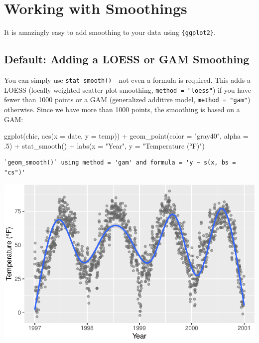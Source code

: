 \documentclass[
  letterpaper,
  DIV=11,
  numbers=noendperiod]{scrreprt}
\newenvironment{Shaded}{\begin{snugshade}}{\end{snugshade}}
\newcommand{\AttributeTok}[1]{\textcolor[rgb]{0.40,0.45,0.13}{#1}}
\newcommand{\DecValTok}[1]{\textcolor[rgb]{0.68,0.00,0.00}{#1}}
\newcommand{\FunctionTok}[1]{\textcolor[rgb]{0.28,0.35,0.67}{#1}}
\newcommand{\NormalTok}[1]{\textcolor[rgb]{0.00,0.23,0.31}{#1}}
\newcommand{\SpecialCharTok}[1]{\textcolor[rgb]{0.37,0.37,0.37}{#1}}
\newcommand{\StringTok}[1]{\textcolor[rgb]{0.13,0.47,0.30}{#1}}
\begin{document}
\chapter{Working with Smoothings}\label{smooths}

It is amazingly easy to add smoothing to your data using
\texttt{\{ggplot2\}}.

\section{Default: Adding a LOESS or GAM
Smoothing}\label{default-adding-a-loess-or-gam-smoothing}

You can simply use \texttt{stat\_smooth()}---not even a formula is
required. This adds a LOESS (locally weighted scatter plot smoothing,
\texttt{method\ =\ "loess"}) if you have fewer than 1000 points or a GAM
(generalized additive model, \texttt{method\ =\ "gam"}) otherwise. Since
we have more than 1000 points, the smoothing is based on a GAM:

\begin{Shaded}
\begin{Highlighting}[]
\FunctionTok{ggplot}\NormalTok{(chic, }\FunctionTok{aes}\NormalTok{(}\AttributeTok{x =}\NormalTok{ date, }\AttributeTok{y =}\NormalTok{ temp)) }\SpecialCharTok{+}
  \FunctionTok{geom\_point}\NormalTok{(}\AttributeTok{color =} \StringTok{"gray40"}\NormalTok{, }\AttributeTok{alpha =}\NormalTok{ .}\DecValTok{5}\NormalTok{) }\SpecialCharTok{+}
  \FunctionTok{stat\_smooth}\NormalTok{() }\SpecialCharTok{+}
  \FunctionTok{labs}\NormalTok{(}\AttributeTok{x =} \StringTok{"Year"}\NormalTok{, }\AttributeTok{y =} \StringTok{"Temperature (°F)"}\NormalTok{) }
\end{Highlighting}
\end{Shaded}

\begin{verbatim}
`geom_smooth()` using method = 'gam' and formula = 'y ~ s(x, bs = "cs")'
\end{verbatim}

\includegraphics{ch17_files/figure-pdf/stat-smooth-1.pdf}
\end{document}
